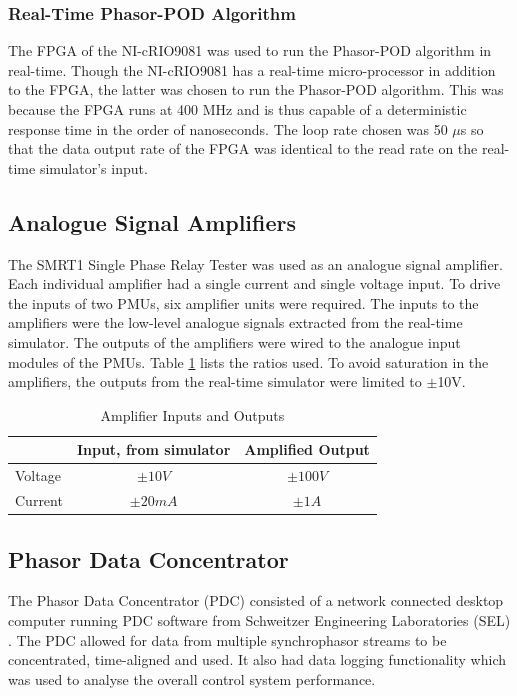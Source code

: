 \documentclass[a4paper, 10 pt, conference]{IEEEtran}
\begin{document}
\subsubsection*{Real-Time Phasor-POD Algorithm} The FPGA of the NI-cRIO9081 was used to run the Phasor-POD algorithm in real-time. Though the NI-cRIO9081 has a real-time micro-processor in addition to the FPGA, the latter was chosen to run the Phasor-POD algorithm. This was because the FPGA runs at 400 MHz and is thus capable of a deterministic response time in the order of nanoseconds. The loop rate chosen was 50 $\mu$s so that the data output rate of the FPGA was identical to the read rate on the real-time simulator's input.

\subsection{Analogue Signal Amplifiers}
The SMRT1 Single Phase Relay Tester \cite{Megger} was used as an analogue signal amplifier. Each individual amplifier had a single current and single voltage input. To drive the inputs of two PMUs, six amplifier units were required. The inputs to the amplifiers were the low-level analogue signals extracted from the real-time simulator. The outputs of the amplifiers were wired to the analogue input modules of the PMUs. Table \ref{AmplifierTable} lists the ratios used. To avoid saturation in the amplifiers, the outputs from the real-time simulator were limited to $\pm$10V. 

\begin{table}[!ht]
\caption{Amplifier Inputs and Outputs}\label{AmplifierTable}
\begin{center}
\begin{tabular}{|l|c|c|}
\hline \textbf{} & \textbf{Input, from simulator} & \textbf{Amplified Output} \\
\hline Voltage &$\pm10 V$&$\pm 100 V$\\ 
\hline Current & $\pm 20 mA$ & $\pm 1 A$\\ 
\hline 
\end{tabular}
\end{center}
\end{table} 

\subsection{Phasor Data Concentrator}
The Phasor Data Concentrator (PDC) consisted of a network connected desktop computer running PDC software from Schweitzer Engineering Laboratories (SEL) \cite{SEL}. The PDC allowed for data from multiple synchrophasor streams to be concentrated, time-aligned and used. It also had data logging functionality which was used to analyse the overall control system performance.
\end{document}
